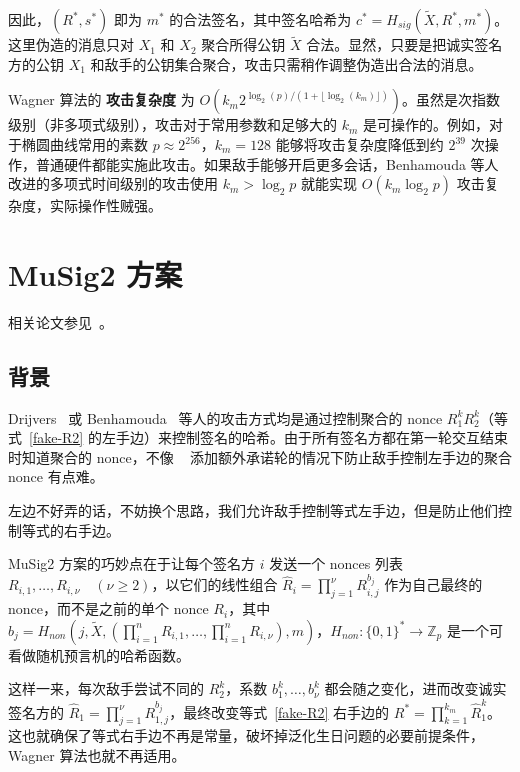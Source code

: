 \documentclass[a4paper,10pt]{article}
\newcommand{\bZ}{\mathbb{Z}}
\begin{document}
因此，\((R^*,s^*)\) 即为 \(m^*\) 的合法签名，其中签名哈希为 \(c^* = H_{sig}(\tilde{X},R^*,m^*)\)。
这里伪造的消息只对 \(X_1\) 和 \(X_2\) 聚合所得公钥 \(\tilde{X}\) 合法。显然，只要是把诚实签名方的公钥 \(X_1\) 和敌手的公钥集合聚合，攻击只需稍作调整伪造出合法的消息。

Wagner 算法的 \textbf{攻击复杂度} 为 \(O(k_m 2^{\log_2(p)/(1+\lfloor \log_2(k_m) \rfloor)})\)。虽然是次指数级别（非多项式级别），攻击对于常用参数和足够大的 \(k_m\) 是可操作的。例如，对于椭圆曲线常用的素数 \(p\approx 2^{256}\)，\(k_m=128\) 能够将攻击复杂度降低到约 \(2^{39}\) 次操作，普通硬件都能实施此攻击。如果敌手能够开启更多会话，Benhamouda 等人~\cite{cryptoeprint:2020:945} 改进的多项式时间级别的攻击使用 \(k_m>\log_2 p\) 就能实现 \(O(k_m\log_2 p)\) 攻击复杂度，实际操作性贼强。

\section{MuSig2 方案}

相关论文参见~\cite{cryptoeprint:2020:1261,jonasnick2020MuSig2}。

\subsection{背景}
Drijvers~\cite{2019On} 或 Benhamouda~\cite{cryptoeprint:2020:945} 等人的攻击方式均是通过控制聚合的 nonce \(R_1^k R_2^k\)（等式~\ref{fake-R2} 的左手边）来控制签名的哈希。由于所有签名方都在第一轮交互结束时知道聚合的 nonce，不像 ~\cite{cryptoeprint:2018:068} 添加额外承诺轮的情况下防止敌手控制左手边的聚合 nonce 有点难。

左边不好弄的话，不妨换个思路，我们允许敌手控制等式左手边，但是防止他们控制等式的右手边。

MuSig2 方案的巧妙点在于让每个签名方 \(i\) 发送一个 nonces 列表 \(R_{i,1},\dots,R_{i,\nu}\quad (\nu\geq 2)\)，以它们的线性组合 \(\hat{R}_i=\prod_{j=1}^{\nu}R_{i,j}^{b_j}\) 作为自己最终的 nonce，而不是之前的单个 nonce \(R_i\)，其中 \( b_j=H_{non}(j,\tilde{X},(\prod_{i=1}^n R_{i,1},\dots,\prod_{i=1}^n R_{i,\nu}),m) \)，\(H_{non}: \{0,1\}^*\rightarrow \bZ_p\) 是一个可看做随机预言机的哈希函数。

这样一来，每次敌手尝试不同的 \(R_2^k\)，系数 \(b_1^k,\dots,b_{\nu}^k\) 都会随之变化，进而改变诚实签名方的 \(\hat{R}_1=\prod_{j=1}^{\nu}R_{1,j}^{b_j}\)，最终改变等式~\ref{fake-R2} 右手边的 \(R^*=\prod_{k=1}^{k_m} \hat{R}_1^k\)。这也就确保了等式右手边不再是常量，破坏掉泛化生日问题的必要前提条件，Wagner 算法也就不再适用。
\end{document}
